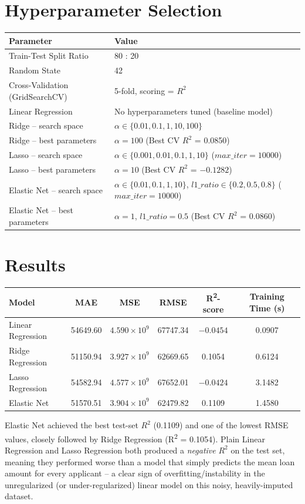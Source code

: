 \documentclass[12pt,a4paper]{article}
\begin{document}
\section{Hyperparameter Selection}
\begin{tabular}{ll}
\toprule
Parameter & Value\\
\midrule
Train-Test Split Ratio & 80 : 20\\
Random State & 42\\
Cross-Validation (GridSearchCV) & 5-fold, scoring = $R^2$\\
Linear Regression & No hyperparameters tuned (baseline model)\\
Ridge -- search space & $\alpha \in \{0.01, 0.1, 1, 10, 100\}$\\
Ridge -- best parameters & $\alpha = 100$ (Best CV $R^2$ = 0.0850)\\
Lasso -- search space & $\alpha \in \{0.001, 0.01, 0.1, 1, 10\}$ ($max\_iter=10000$)\\
Lasso -- best parameters & $\alpha = 10$ (Best CV $R^2$ = $-0.1282$)\\
Elastic Net -- search space & $\alpha \in \{0.01, 0.1, 1, 10\}$, $l1\_ratio \in \{0.2, 0.5, 0.8\}$ ($max\_iter=10000$)\\
Elastic Net -- best parameters & $\alpha = 1$, $l1\_ratio = 0.5$ (Best CV $R^2$ = 0.0860)\\
\bottomrule
\end{tabular}

\section{Results}
\begin{longtable}{lccccc}
\toprule
Model & MAE & MSE & RMSE & R\textsuperscript{2}-score & Training Time (s)\\
\midrule
Linear Regression & 54649.60 & $4.590\times10^{9}$ & 67747.34 & $-0.0454$ & 0.0907\\
Ridge Regression & 51150.94 & $3.927\times10^{9}$ & 62669.65 & 0.1054 & 0.6124\\
Lasso Regression & 54582.94 & $4.577\times10^{9}$ & 67652.01 & $-0.0424$ & 3.1482\\
Elastic Net & 51570.51 & $3.904\times10^{9}$ & 62479.82 & 0.1109 & 1.4580\\
\bottomrule
\end{longtable}
\noindent Elastic Net achieved the best test-set $R^2$ (0.1109) and one of the lowest RMSE values, closely followed by Ridge Regression (R\textsuperscript{2} = 0.1054). Plain Linear Regression and Lasso Regression both produced a \emph{negative} $R^2$ on the test set, meaning they performed worse than a model that simply predicts the mean loan amount for every applicant -- a clear sign of overfitting/instability in the unregularized (or under-regularized) linear model on this noisy, heavily-imputed dataset.
\end{document}
